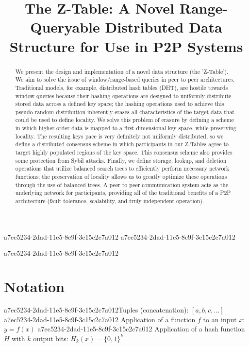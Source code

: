 \documentclass[12pt]{article}
\title{The Z-Table: A Novel Range-Queryable Distributed Data Structure for Use in P2P Systems}
\begin{document}
a7ec5234-2dad-11e5-8c9f-3c15c2c7a012
a7ec5234-2dad-11e5-8c9f-3c15c2c7a012\maketitle
a7ec5234-2dad-11e5-8c9f-3c15c2c7a012
\begin{abstract}
We present the design and implementation of a novel data structure (the 'Z-Table'). We aim to solve the issue of window/range-based queries in peer to peer architectures. Traditional models, for example,  distributed hash tables (DHT), are hostile towards window queries because their hashing operations are designed to uniformly distribute stored data across a defined key space; the hashing operations used to achieve this pseudo-random distribution inherently erases all characteristics of the target data that could be used to define locality. We solve this problem of erasure by defining a scheme in which higher-order data is mapped to a first-dimensional key space, while preserving locality. The resulting keys pace is very definitely not uniformly distributed, so we define a distributed consensus scheme in which participants in our Z-Tables agree to target highly populated regions of the key space. This consensus scheme also provides some protection from Sybil attacks. Finally, we define storage, lookup, and deletion operations that utilize balanced search trees to efficiently perform necessary network functions; the preservation of locality allows us to greatly optimize these operations through the use of balanced trees. A peer to peer communication system acts as the underlying network for participants, providing all of the traditional benefits of a P2P architecture (fault tolerance, scalability, and truly independent operation).
\end{abstract}

\section{Notation}

a7ec5234-2dad-11e5-8c9f-3c15c2c7a012Tuples (concatenation): $[a,b,c,...]$
a7ec5234-2dad-11e5-8c9f-3c15c2c7a012
Application of a function $f$ to an input $x$: $y=f(x)$
a7ec5234-2dad-11e5-8c9f-3c15c2c7a012
Application of a hash function $H$ with $k$ output bits: $H_{k}(x) = \{0,1\}^k$
\end{document}
